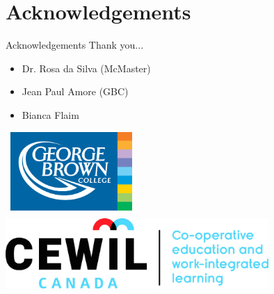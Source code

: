 \documentclass{beamer}
\begin{document}
	\section{Acknowledgements}
	\begin{frame}{Acknowledgements}
		Thank you...
		\begin{itemize}
			\item Dr. Rosa da Silva (McMaster)
			\item Jean Paul Amore (GBC)
			\item Bianca Flaim
			
		\end{itemize}
	\centering
	\includegraphics[width=5cm, height=3cm]{gbc.png}	
	\includegraphics[width=10cm, height=3cm]{cewil.jpg}
	\end{frame}
\end{document}
